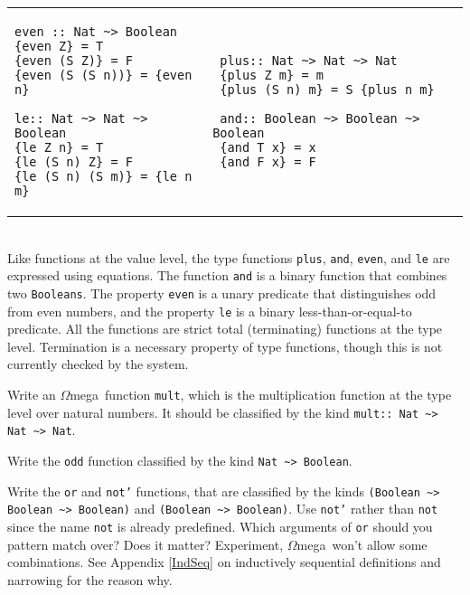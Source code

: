 \documentclass[11pt,twoside,A4]{llncs}
\newcommand{\om}{\emph{$\Omega$}mega}
\begin{document}
\vspace*{.05in}
\begin{tabular}{l|l}
\begin{minipage}[t]{2.2in}
{\small
\begin{verbatim}
even :: Nat ~> Boolean
{even Z} = T
{even (S Z)} = F
{even (S (S n))} = {even n}
 
le:: Nat ~> Nat ~> Boolean 
{le Z n} = T
{le (S n) Z} = F
{le (S n) (S m)} = {le n m}
\end{verbatim}}
\end{minipage}
&
\begin{minipage}[t]{2.8in}
{\small
\begin{verbatim}
 plus:: Nat ~> Nat ~> Nat
 {plus Z m} = m
 {plus (S n) m} = S {plus n m}
 
 and:: Boolean ~> Boolean ~> Boolean
 {and T x} = x
 {and F x} = F
\end{verbatim}}
\end{minipage}
\end{tabular}
\vspace*{0.05in}\\ \noindent
Like functions at the value level, the type functions  {\tt plus}, {\tt and},
{\tt even}, and {\tt le} are expressed using equations. The function {\tt and}
is a binary function that combines two {\tt Booleans}.  The property {\tt even}
is a unary predicate that distinguishes odd from even numbers, and the property
{\tt le} is a binary less-than-or-equal-to predicate. All the functions are
strict total (terminating) functions at the type level. Termination
is a necessary property of type functions, though this is not
currently checked by the system.

\begin{exercise}
Write an \om\ function {\tt mult}, which is the multiplication
function at the type level over natural numbers.
It should be classified by the kind
\verb+mult:: Nat ~> Nat ~> Nat+.
\end{exercise}

\begin{exercise}
Write the {\tt odd} function classified by the kind \verb+Nat ~> Boolean+.
\end{exercise}

\begin{exercise}
Write the {\tt or} and {\tt not'} functions, that are classified by the kinds
\verb+(Boolean ~> Boolean ~> Boolean)+  and  \verb+(Boolean ~> Boolean)+.
Use {\tt not'} rather than {\tt not} since the name {\tt not}
is already predefined.
Which arguments of {\tt or} should you pattern match over?
Does it matter? Experiment, \om\ won't allow some combinations.
See Appendix \ref{IndSeq} 
on inductively sequential definitions and narrowing for the reason why.
\end{exercise}
\end{document}
